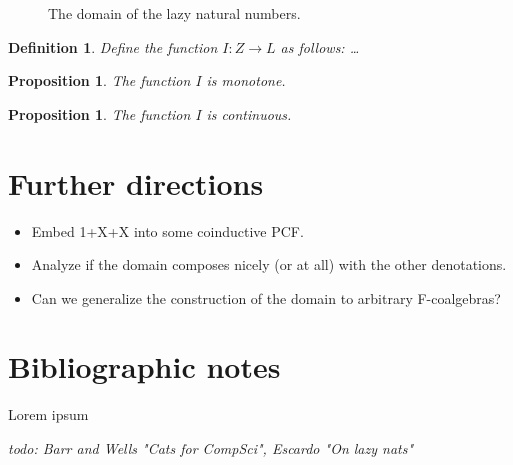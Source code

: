 \documentclass[a4paper]{article}
\newcommand{\arr}{\rightarrow}
\newcommand{\todo}[1]{\bigskip \noindent \emph{todo: #1}}
\newtheorem{defIMapsNuFToL}[defNuF]{Definition}
\newtheorem{thmIIsMonotone}[defNuF]{Proposition}
\newtheorem{thmIIsContinuous}[defNuF]{Proposition}
\begin{document}
\begin{figure}
\begin{center}
\end{center}
\caption{The domain of the lazy natural numbers.}
\label{fig:DomainOfLazyNaturals}
\end{figure}

\begin{defIMapsNuFToL}

Define the function $I : Z \arr L$ as follows: \ldots

\end{defIMapsNuFToL}


\begin{thmIIsMonotone}

The function $I$ is monotone.

\end{thmIIsMonotone}


\begin{thmIIsContinuous}

The function $I$ is continuous.

\end{thmIIsContinuous}

\section{Further directions}

\begin{itemize}
\item Embed 1+X+X into some coinductive PCF.
\item Analyze if the domain composes nicely (or at all) with the other
denotations.
\item Can we generalize the construction of the domain to arbitrary
F-coalgebras?
\end{itemize}

\section{Bibliographic notes}

Lorem ipsum \cite{Pierce1991} \cite{Gunter1992} \cite{Bird1997}
\cite{Mitchell1996} \cite{Allison1986} \cite{Capretta2002}

\todo{Barr and Wells "Cats for CompSci", Escardo "On lazy nats"}



\end{document}
